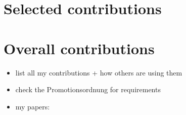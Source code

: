 \section{Selected contributions}

\section{Overall contributions}

\begin{itemize}
  \item list all my contributions + how others are using them
\end{itemize}

\begin{itemize}
  \item check the Promotionsordnung for requirements
  \item my papers: \cites{}
\end{itemize}
